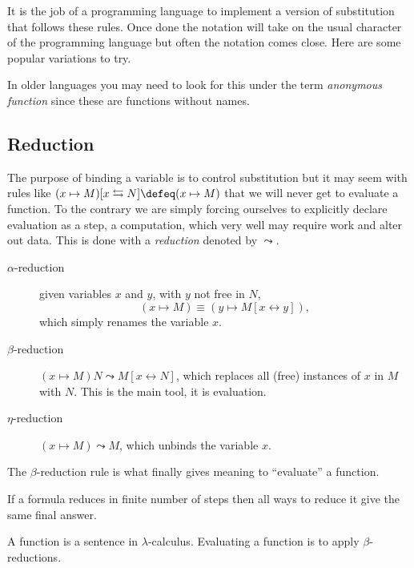 It is the job of a programming language to implement a version 
of substitution that follows these rules.  Once done the notation will take 
on the usual character of the programming language but often the notation 
comes close.  Here are some popular variations to try.
\begin{center}
\end{center} 
In older languages you may need to look for this under the term \emph{anonymous function}
since these are functions without names.

\subsection{Reduction}
The purpose of binding a variable is to control substitution but it may seem 
with rules like $(x\mapsto M)[x\leftrightarrows N]\defeq (x\mapsto M)$ that 
we will never get to evaluate a function.  To the contrary we are simply forcing 
ourselves to explicitly declare evaluation as a step, a computation, which 
very well may require work and alter out data.  This is done with a \emph{reduction}
denoted by $\leadsto$.
\begin{description}
    \item[$\alpha$-reduction] given variables $x$ and $y$, with $y$ not free in $N$,
    \[(x\mapsto M)\equiv (y\mapsto M[x\leftrightarrow y]),\]
    which simply renames the variable $x$.

    \item[$\beta$-reduction]
    $(x\mapsto M)N\leadsto M[x\leftrightarrow N]$, which replaces all (free)
    instances of $x$ in $M$ with $N$.  This is the main tool, it is evaluation.
    
    \item[$\eta$-reduction]
    $(x\mapsto M)\leadsto M$, which unbinds the variable $x$.
\end{description}

The $\beta$-reduction rule is what finally gives meaning to ``evaluate'' a function.

\begin{theorem}
    If a formula reduces in finite number of steps then all ways to reduce it give the same 
    final answer.
\end{theorem}


\begin{definition}
    A function is a sentence in $\lambda$-calculus.
    Evaluating a function is to apply $\beta$-reductions.
\end{definition}

